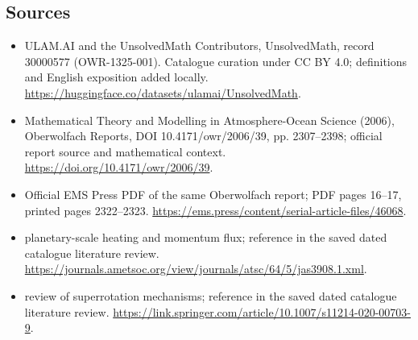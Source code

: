 \documentclass[11pt]{article}
\begin{document}
\subsection{Sources}
\begin{itemize}
\item[\hypertarget{source:30000577:1}{S1}] ULAM.AI and the UnsolvedMath Contributors, UnsolvedMath, record 30000577 (OWR-1325-001). Catalogue curation under CC BY 4.0; definitions and English exposition added locally.
\url{https://huggingface.co/datasets/ulamai/UnsolvedMath}.
\item[\hypertarget{source:30000577:2}{S2}] Mathematical Theory and Modelling in Atmosphere-Ocean Science (2006), Oberwolfach Reports, DOI 10.4171/owr/2006/39, pp. 2307--2398; official report source and mathematical context.
\url{https://doi.org/10.4171/owr/2006/39}.
\item[\hypertarget{source:30000577:3}{S3}] Official EMS Press PDF of the same Oberwolfach report; PDF pages 16--17, printed pages 2322--2323.
\url{https://ems.press/content/serial-article-files/46068}.
\item[\hypertarget{source:30000577:4}{S4}] planetary-scale heating and momentum flux; reference in the saved dated catalogue literature review.
\url{https://journals.ametsoc.org/view/journals/atsc/64/5/jas3908.1.xml}.
\item[\hypertarget{source:30000577:5}{S5}] review of superrotation mechanisms; reference in the saved dated catalogue literature review.
\url{https://link.springer.com/article/10.1007/s11214-020-00703-9}.
\end{itemize}
\label{end:30000577}
\end{document}
